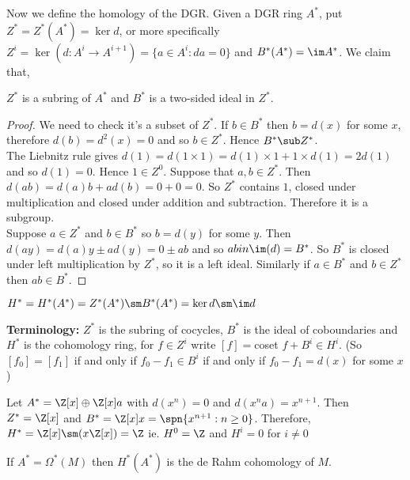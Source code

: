 Now we define the homology of the DGR. Given a DGR ring $A^*$, put $Z^* = Z^*(A^*) = \ker d$, or more specifically $Z^i = \ker (d : A^i \to A^{i+1}) = \{a \in A^i : da = 0\}$ and $B^*(A^*) = \im A^*$. We claim that,
\begin{claim}
  $Z^*$ is a subring of $A^*$ and $B^*$ is a two-sided ideal in $Z^*$.
\end{claim}
\begin{proof}
  We need to check it's a subset of $Z^*$. If $b \in B^*$ then $b = d(x)$ for some $x$, therefore $d(b) = d^2(x) = 0$ and so $b \in Z^*$. Hence $B^* \sub Z^*$.\\

  \noindent
  The Liebnitz rule gives $d(1) = d(1 \times 1) = d(1) \times 1 + 1 \times d(1) = 2d(1)$ and so $d(1) = 0$. Hence $1 \in Z^0$. Suppose that $a, b \in Z^*$. Then $d(ab) = d(a)b + ad(b) = 0 + 0 = 0$. So $Z^*$ contains $1$, closed under multiplication and closed under addition and subtraction. Therefore it is a subgroup. \\

  \noindent
  Suppose $a \in Z^*$ and $b \in B^*$ so $b = d(y)$ for some $y$. Then $d(ay) = d(a)y \pm ad(y) = 0 \pm ab$ and so $ab in \im(d) = B^*$. So $B^*$ is closed under left multiplication by $Z^*$, so it is a left ideal. Similarly if $a \in B^*$ and $b \in Z^*$ then $ab \in B^*$.
\end{proof}



\begin{ndefi}[Cohomology]
  $H^* = H^*(A^*) = Z^*(A^*)\sm B^*(A^*) = \ker d \sm \im d$
\end{ndefi}

\textbf{Terminology: }$Z^*$ is the subring of cocycles, $B^*$ is the ideal of coboundaries and $H^*$ is the cohomology ring, for $f \in Z^i$ write $[f] = $coset $f + B^i \in H^i$. (So $[f_0] = [f_1]$ if and only if $f_0 - f_1 \in B^i$ if and only if $f_0 - f_1 = d(x)$ for some $x$)

\begin{eg}
  Let $A^* = \Z[x] \oplus \Z[x]a$ with $d(x^n) = 0$ and $d(x^na) = x^{n+1}$. Then $Z^* = \Z[x]$ and $B^* = \Z[x]x = \spn \{x^{n+1} : n \ge 0\}$. Therefore, $H^* = \Z[x] \sm (x\Z[x]) = \Z$ ie. $H^0 = \Z$ and $H^i = 0$ for $i \ne 0$
\end{eg}

\begin{eg}
  If $A^* = \Omega^*(M)$ then $H^*(A^*)$ is the de Rahm cohomology of $M$.
\end{eg}

